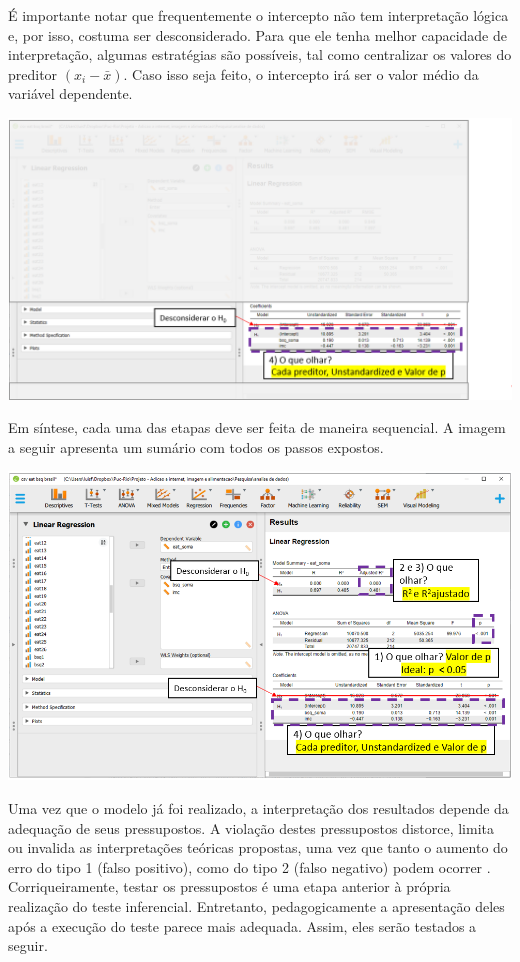 \documentclass[
]{book}
\begin{document}
É importante notar que frequentemente o intercepto não tem interpretação lógica e, por isso, costuma ser desconsiderado. Para que ele tenha melhor capacidade de interpretação, algumas estratégias são possíveis, tal como centralizar os valores do preditor \((x_i-\bar{x})\). Caso isso seja feito, o intercepto irá ser o valor médio da variável dependente.

\includegraphics{./img/cap_reg_multipla_resultado_4.png}

Em síntese, cada uma das etapas deve ser feita de maneira sequencial. A imagem a seguir apresenta um sumário com todos os passos expostos.

\includegraphics{./img/cap_reg_multipla_resultado_5.png}

Uma vez que o modelo já foi realizado, a interpretação dos resultados depende da adequação de seus pressupostos. A violação destes pressupostos distorce, limita ou invalida as interpretações teóricas propostas, uma vez que tanto o aumento do erro do tipo 1 (falso positivo), como do tipo 2 (falso negativo) podem ocorrer \citep{Lix1996, Barker2015, Ernst2017}. Corriqueiramente, testar os pressupostos é uma etapa anterior à própria realização do teste inferencial. Entretanto, pedagogicamente a apresentação deles após a execução do teste parece mais adequada. Assim, eles serão testados a seguir.
\end{document}
